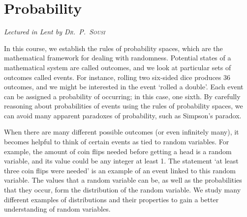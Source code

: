 \chapter[Probability \\ \textnormal{\emph{Lectured in Lent \oldstylenums{2021} by \textsc{Dr.\ P.\ Sousi}}}]{Probability}
\emph{\Large Lectured in Lent  by \textsc{Dr.\ P.\ Sousi}}

In this course, we establish the rules of probability spaces, which are the mathematical framework for dealing with randomness.
Potential states of a mathematical system are called outcomes, and we look at particular sets of outcomes called events.
For instance, rolling two six-sided dice produces 36 outcomes, and we might be interested in the event `rolled a double'.
Each event can be assigned a probability of occurring; in this case, one sixth.
By carefully reasoning about probabilities of events using the rules of probability spaces, we can avoid many apparent paradoxes of probability, such as Simpson's paradox.

When there are many different possible outcomes (or even infinitely many), it becomes helpful to think of certain events as tied to random variables.
For example, the amount of coin flips needed before getting a head is a random variable, and its value could be any integer at least 1.
The statement `at least three coin flips were needed' is an example of an event linked to this random variable.
The values that a random variable can be, as well as the probabilities that they occur, form the distribution of the random variable.
We study many different examples of distributions and their properties to gain a better understanding of random variables.


